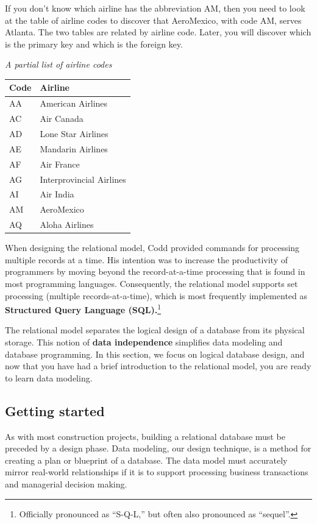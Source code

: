 \documentclass[
]{article}
\begin{document}
If you don't know which airline has the abbreviation AM, then you need
to look at the table of airline codes to discover that AeroMexico, with
code AM, serves Atlanta. The two tables are related by airline code.
Later, you will discover which is the primary key and which is the
foreign key.

\emph{A partial list of airline codes}

\begin{longtable}[]{@{}ll@{}}
\toprule()
Code & Airline \\
\midrule()
\endhead
AA & American Airlines \\
AC & Air Canada \\
AD & Lone Star Airlines \\
AE & Mandarin Airlines \\
AF & Air France \\
AG & Interprovincial Airlines \\
AI & Air India \\
AM & AeroMexico \\
AQ & Aloha Airlines \\
\bottomrule()
\end{longtable}

When designing the relational model, Codd provided commands for
processing multiple records at a time. His intention was to increase the
productivity of programmers by moving beyond the record-at-a-time
processing that is found in most programming languages. Consequently,
the relational model supports set processing (multiple
records-at-a-time), which is most frequently implemented as
\textbf{Structured Query Language (SQL).}\footnote{Officially pronounced
  as ``S-Q-L,'' but often also pronounced as ``sequel''.}

The relational model separates the logical design of a database from its
physical storage. This notion of \textbf{data independence} simplifies
data modeling and database programming. In this section, we focus on
logical database design, and now that you have had a brief introduction
to the relational model, you are ready to learn data modeling.

\hypertarget{getting-started}{%
\subsection{Getting started}\label{getting-started}}

As with most construction projects, building a relational database must
be preceded by a design phase. Data modeling, our design technique, is a
method for creating a plan or blueprint of a database. The data model
must accurately mirror real-world relationships if it is to support
processing business transactions and managerial decision making.
\end{document}
